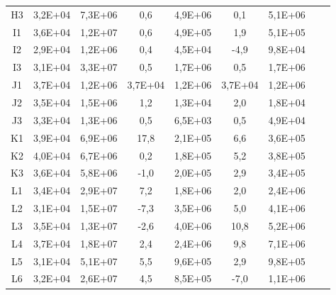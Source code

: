 \begin{center}
\begin{longtable}{ccccccccc}
H3    & 3,2E+04 & 7,3E+06 & 0,6   & 4,9E+06 & 0,1   & 5,1E+06 \\
I1    & 3,6E+04 & 1,2E+07 & 0,6   & 4,9E+05 & 1,9   & 5,1E+05 \\
I2    & 2,9E+04 & 1,2E+06 & 0,4   & 4,5E+04 & -4,9  & 9,8E+04 \\
I3    & 3,1E+04 & 3,3E+07 & 0,5   & 1,7E+06 & 0,5   & 1,7E+06 \\
J1    & 3,7E+04 & 1,2E+06 & 3,7E+04 & 1,2E+06 & 3,7E+04 & 1,2E+06 \\
J2    & 3,5E+04 & 1,5E+06 & 1,2   & 1,3E+04 & 2,0   & 1,8E+04 \\
J3    & 3,3E+04 & 1,3E+06 & 0,5   & 6,5E+03 & 0,5   & 4,9E+04 \\
K1    & 3,9E+04 & 6,9E+06 & 17,8  & 2,1E+05 & 6,6   & 3,6E+05 \\
K2    & 4,0E+04 & 6,7E+06 & 0,2   & 1,8E+05 & 5,2   & 3,8E+05 \\
K3    & 3,6E+04 & 5,8E+06 & -1,0  & 2,0E+05 & 2,9   & 3,4E+05 \\
L1    & 3,4E+04 & 2,9E+07 & 7,2   & 1,8E+06 & 2,0   & 2,4E+06 \\
L2    & 3,1E+04 & 1,5E+07 & -7,3  & 3,5E+06 & 5,0   & 4,1E+06 \\
L3    & 3,5E+04 & 1,3E+07 & -2,6  & 4,0E+06 & 10,8  & 5,2E+06 \\
L4    & 3,7E+04 & 1,8E+07 & 2,4   & 2,4E+06 & 9,8   & 7,1E+06 \\
L5    & 3,1E+04 & 5,1E+07 & 5,5   & 9,6E+05 & 2,9   & 9,8E+05 \\
L6    & 3,2E+04 & 2,6E+07 & 4,5   & 8,5E+05 & -7,0  & 1,1E+06 \\
\end{longtable}
\end{center}

